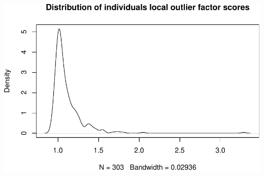\documentclass[]{article}
\begin{document}
\includegraphics{project_report_files/figure-latex/unnamed-chunk-4-1.pdf}
\end{document}

